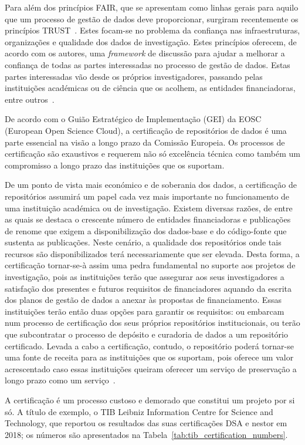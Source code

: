 \documentclass[sigconf,nonacm]{acmart}
\begin{document}
Para além dos princípios FAIR, que se apresentam como linhas gerais para aquilo que um processo de gestão de dados deve proporcionar, surgiram recentemente os princípios TRUST~\cite{TRUSTprinciples}. Estes focam-se no problema da confiança nas infraestruturas, organizações e qualidade dos dados de investigação. Estes princípios oferecem, de acordo com os autores, uma \emph{framework} de discussão para ajudar a melhorar a confiança de todas as partes interessadas no processo de gestão de dados. Estas partes interessadas vão desde os próprios investigadores, passando pelas instituições académicas ou de ciência que os acolhem, as entidades financiadoras, entre outros~\cite{DCC_stakeholders}. 

De acordo com o Guião Estratégico de Implementação (GEI) da EOSC (European Open Science Cloud), a certificação de repositórios de dados é uma parte essencial na visão a longo prazo da Comissão Europeia. Os processos de certificação são exaustivos e requerem não só excelência técnica como também um compromisso a longo prazo das instituições que os suportam. 

De um ponto de vista mais económico e de soberania dos dados, a certificação de repositórios assumirá um papel cada vez mais importante no funcionamento de uma instituição académica ou de investigação. Existem diversas razões, de entre as quais se destaca o crescente número de entidades financiadoras e publicações de renome que exigem a disponibilização dos dados-base e do código-fonte que sustenta as publicações. Neste cenário, a qualidade dos repositórios onde tais recursos são disponibilizados terá necessariamente que ser elevada. Desta forma, a certificação tornar-se-à assim uma pedra fundamental no suporte aos projetos de investigação, pois as instituições terão que assegurar aos seus investigadores a satisfação dos presentes e futuros requisitos de financiadores aquando da escrita dos planos de gestão de dados a anexar às propostas de financiamento. Essas instituições terão então duas opções para garantir os requisitos: ou embarcam num processo de certificação dos seus próprios repositórios institucionais, ou terão que subcontratar o processo de depósito e curadoria de dados a um repositório certificado. Levada a cabo a certificação, contudo, o repositório poderá tornar-se uma fonte de receita para as instituições que os suportam, pois oferece um valor acrescentado caso essas instituições queiram oferecer um serviço de preservação a longo prazo como um serviço~\cite{Lindlar_Schwab_2019}.

A certificação é um processo custoso e demorado que constitui um projeto por si só. A título de exemplo, o TIB Leibniz Information Centre for Science and Technology, que reportou os resultados das suas certificações DSA e nestor em 2018; os números são apresentados na Tabela~\ref{tab:tib_certification_numbers}.
\end{document}
